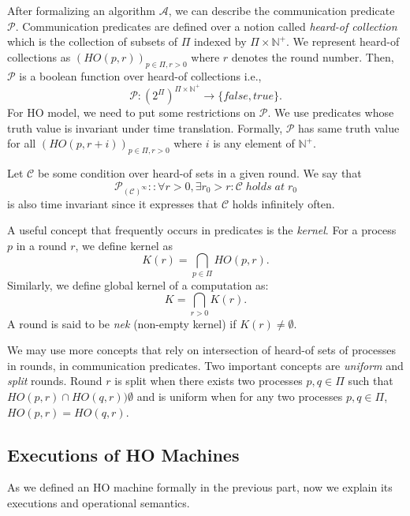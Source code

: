 \documentclass{llncs}
\begin{document}
After formalizing an algorithm $\mathcal{A}$, we can describe the communication predicate $\mathcal{P}$. Communication predicates are defined over a notion called \emph{heard-of collection} which is the collection of subsets of $\Pi$ indexed by $\Pi \times \mathbb{N^+}$. We represent heard-of collections as $(HO(p,r))_{p\in \Pi, r>0}$ where $r$ denotes the round number. Then, $\mathcal{P}$ is a boolean function over heard-of collections i.e., 
$$ \mathcal{P} : (2^\Pi)^{\Pi \times \mathbb{N^+}} \rightarrow \{false,true\}.$$
For HO model, we need to put some restrictions on $\mathcal{P}$. We use predicates whose truth value is invariant under time translation. Formally, $\mathcal{P}$ has same truth value for all $(HO(p,r+i))_{p\in \Pi, r>0}$ where $i$ is any element of $\mathbb{N^+}$.

Let $\mathcal{C}$ be some condition over heard-of sets in a given round. We say that $$\mathcal{P}_{(\mathcal{C})^\infty} :: \forall r>0, \exists r_0>r : \mathcal{C} \; holds \; at \; r_0$$
is also time invariant since it expresses that $\mathcal{C}$ holds infinitely often.

A useful concept that frequently occurs in predicates is the \emph{kernel}. For a process $p$ in a round $r$, we define kernel as $$K(r) = \bigcap_{p\in \Pi} HO(p,r) .$$
Similarly, we define global kernel of a computation as:$$ K = \bigcap_{r>0}K(r).$$
A round is said to be \emph{nek} (non-empty kernel) if $K(r) \neq \emptyset$.

We may use more concepts that rely on intersection of heard-of sets of processes in rounds, in communication predicates. Two important concepts are \emph{uniform} and \emph{split} rounds. Round $r$ is split when there exists two processes $p,q \in \Pi$ such that $HO(p,r) \cap HO(q,r) ) \emptyset$ and is uniform when for any two processes $p,q \in \Pi$, $HO(p,r) = HO(q,r)$.



\subsection{Executions of HO Machines}
As we defined an HO machine formally in the previous part, now we explain its executions and operational semantics.
\end{document}
